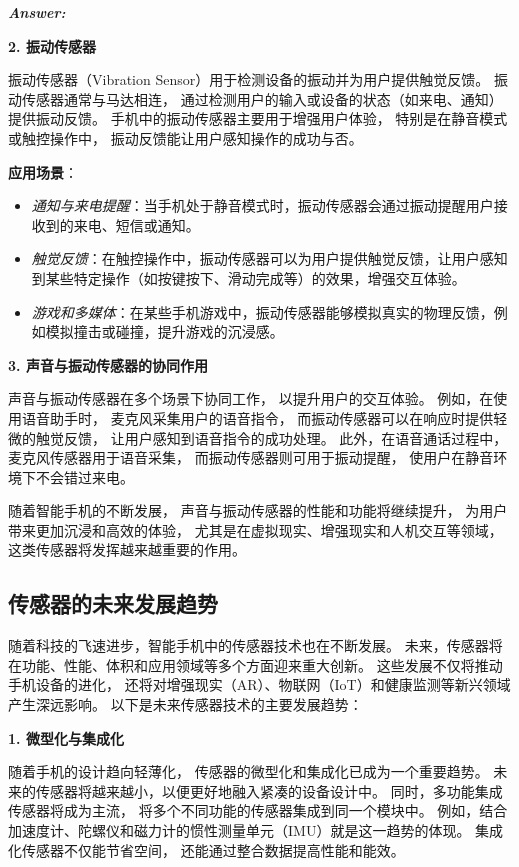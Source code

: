 \documentclass[12pt]{article}
\newenvironment{Answer}{
  \vspace{12pt}
  {\large\textbf{\textit{\hspace{-12pt}Answer:}}}\par
  \vspace{8pt}
} {\vspace{24pt}}
\begin{document}
\begin{Answer}
\noindent\textbf{2. 振动传感器}\noindent

振动传感器（Vibration Sensor）用于检测设备的振动并为用户提供触觉反馈。
振动传感器通常与马达相连，
通过检测用户的输入或设备的状态（如来电、通知）提供振动反馈。
手机中的振动传感器主要用于增强用户体验，
特别是在静音模式或触控操作中，
振动反馈能让用户感知操作的成功与否。

\textbf{应用场景}：
\begin{itemize}
    \item \textit{通知与来电提醒}：当手机处于静音模式时，振动传感器会通过振动提醒用户接收到的来电、短信或通知。
    \item \textit{触觉反馈}：在触控操作中，振动传感器可以为用户提供触觉反馈，让用户感知到某些特定操作（如按键按下、滑动完成等）的效果，增强交互体验。
    \item \textit{游戏和多媒体}：在某些手机游戏中，振动传感器能够模拟真实的物理反馈，例如模拟撞击或碰撞，提升游戏的沉浸感。
\end{itemize}

\noindent\textbf{3. 声音与振动传感器的协同作用}\noindent

声音与振动传感器在多个场景下协同工作，
以提升用户的交互体验。
例如，在使用语音助手时，
麦克风采集用户的语音指令，
而振动传感器可以在响应时提供轻微的触觉反馈，
让用户感知到语音指令的成功处理。
此外，在语音通话过程中，
麦克风传感器用于语音采集，
而振动传感器则可用于振动提醒，
使用户在静音环境下不会错过来电。

随着智能手机的不断发展，
声音与振动传感器的性能和功能将继续提升，
为用户带来更加沉浸和高效的体验，
尤其是在虚拟现实、增强现实和人机交互等领域，
这类传感器将发挥越来越重要的作用。

\subsection*{传感器的未来发展趋势}\noindent

随着科技的飞速进步，智能手机中的传感器技术也在不断发展。
未来，传感器将在功能、性能、体积和应用领域等多个方面迎来重大创新。
这些发展不仅将推动手机设备的进化，
还将对增强现实（AR）、物联网（IoT）和健康监测等新兴领域产生深远影响。
以下是未来传感器技术的主要发展趋势：

\noindent\textbf{1. 微型化与集成化}\noindent

随着手机的设计趋向轻薄化，
传感器的微型化和集成化已成为一个重要趋势。
未来的传感器将越来越小，以便更好地融入紧凑的设备设计中。
同时，多功能集成传感器将成为主流，
将多个不同功能的传感器集成到同一个模块中。
例如，结合加速度计、陀螺仪和磁力计的惯性测量单元（IMU）就是这一趋势的体现。
集成化传感器不仅能节省空间，
还能通过整合数据提高性能和能效。


\end{Answer}
\end{document}
